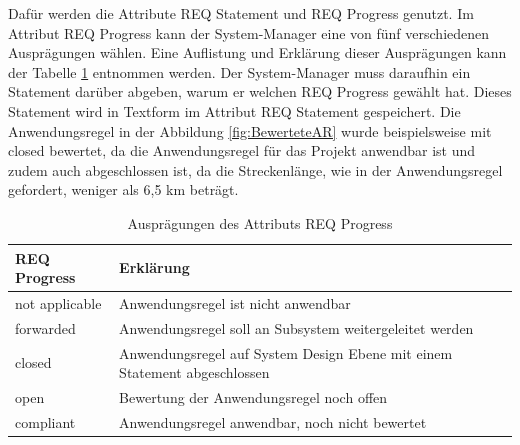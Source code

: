 Dafür werden die Attribute REQ Statement und REQ Progress genutzt. Im Attribut REQ Progress kann der System-Manager eine von fünf verschiedenen
Ausprägungen wählen. Eine Auflistung und Erklärung dieser Ausprägungen kann der Tabelle \ref*{tab:REQProgress} entnommen werden. Der 
System-Manager muss daraufhin ein Statement darüber abgeben, warum er welchen REQ Progress gewählt hat. Dieses Statement wird in Textform im
Attribut REQ Statement gespeichert. Die Anwendungsregel in der Abbildung \ref*{fig:BewerteteAR} wurde beispielsweise mit closed bewertet,
da die Anwendungsregel für das Projekt anwendbar ist und zudem auch abgeschlossen ist, da die Streckenlänge, wie in der Anwendungsregel gefordert,
weniger als 6,5 km beträgt.

\begin{table}[H]
    \begin{center}
        \caption{Ausprägungen des Attributs REQ Progress \cite[vgl. S.28f.]{SMO-AR}}
        \label{tab:REQProgress}
        \begin{tabularx}{\textwidth}{|l|>{\raggedright\arraybackslash}X |}
            \hline
            \textbf{REQ Progress} & \textbf{Erklärung}\\ \hline
            not applicable & Anwendungsregel ist nicht anwendbar \\ \hline
            forwarded & Anwendungsregel soll an Subsystem weitergeleitet werden \\ \hline
            closed & Anwendungsregel auf System Design Ebene mit einem Statement abgeschlossen \\ \hline
            open &  Bewertung der Anwendungsregel noch offen \\ \hline
            compliant & Anwendungsregel anwendbar, noch nicht bewertet \\ \hline
        \end{tabularx}
    \end{center}
\end{table}